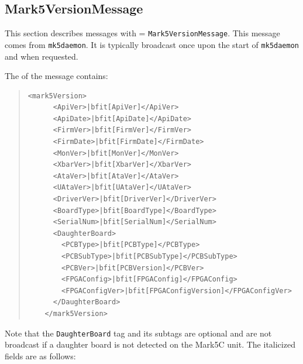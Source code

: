 \begin{description}

\subsection{Mark5VersionMessage} %

This section describes messages with  = {\tt Mark5VersionMessage}.
This message comes from {\tt mk5daemon}.
It is typically broadcast once upon the start of {\tt mk5daemon} and when requested.

The  of the message contains:

\begin{quotation}
\begin{Verbatim}[commandchars=\|\[\]]
    <mark5Version>
      <ApiVer>|bfit[ApiVer]</ApiVer>
      <ApiDate>|bfit[ApiDate]</ApiDate>
      <FirmVer>|bfit[FirmVer]</FirmVer>
      <FirmDate>|bfit[FirmDate]</FirmDate>
      <MonVer>|bfit[MonVer]</MonVer>
      <XbarVer>|bfit[XbarVer]</XbarVer>
      <AtaVer>|bfit[AtaVer]</AtaVer>
      <UAtaVer>|bfit[UAtaVer]</UAtaVer>
      <DriverVer>|bfit[DriverVer]</DriverVer>
      <BoardType>|bfit[BoardType]</BoardType>
      <SerialNum>|bfit[SerialNum]</SerialNum>
      <DaughterBoard>
        <PCBType>|bfit[PCBType]</PCBType>
        <PCBSubType>|bfit[PCBSubType]</PCBSubType>
        <PCBVer>|bfit[PCBVersion]</PCBVer>
        <FPGAConfig>|bfit[FPGAConfig]</FPGAConfig>
        <FPGAConfigVer>|bfit[FPGAConfigVersion]</FPGAConfigVer>
      </DaughterBoard>
    </mark5Version>
\end{Verbatim}
\end{quotation}


\noindent Note that the {\tt DaughterBoard} tag and its subtags are optional and are not broadcast if a daughter board is not detected on the Mark5C unit.
The italicized fields are as follows:


\end{description}
